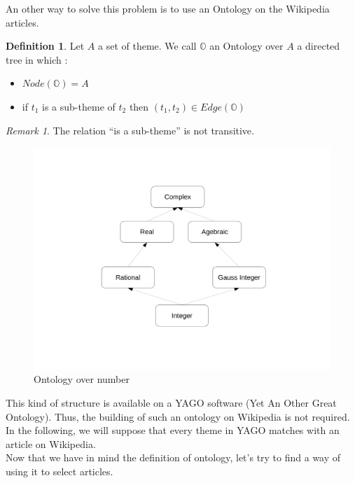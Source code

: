 \documentclass[11pt]{article}
\theoremstyle{plain}
\theoremstyle{definition}
\newtheorem{defn}{Definition}[section]
\theoremstyle{remark}
\newtheorem*{rem}{Remark}
\begin{document}
An other way to solve this problem is to use an Ontology on the Wikipedia articles.

\vspace*{5mm}
\begin{defn}
  Let $A$ a set of theme. We call $\mathbb{O}$ an Ontology over $A$ a directed tree in which :
  \begin{itemize}
  \item $ Node(\mathbb{O}) = A$
  \item if $t_1$ is a sub-theme of $t_2$ then $(t_1,t_2) \in Edge(\mathbb{O})$
  \end{itemize}
\end{defn}

\vspace*{5mm}

\begin{rem}
  The relation ``is a sub-theme'' is not transitive.
\end{rem}

\begin{figure}[!h]
	\centering
    \includegraphics[scale = 0.3]{ExOntology.pdf}
    \caption{Ontology over number}
\end{figure}

This kind of structure is available on a YAGO software (Yet An Other Great Ontology). Thus, the building of such an ontology on Wikipedia is not required. In the following, we will suppose that every theme in YAGO matches with an article on Wikipedia. \\
Now that we have in mind the definition of ontology, let's try to find a way of using it to select articles.\\
\end{document}
